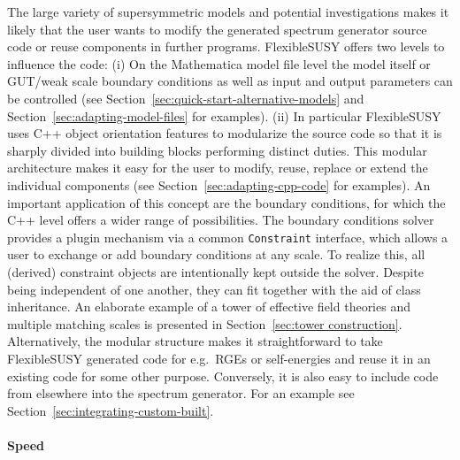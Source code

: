 \documentclass[final,3p,11pt,pdflatex]{elsarticle}
\makeatletter
\newcommand{\fs}{FlexibleSUSY\@\xspace}
\newcommand{\mathematica}{Mathematica\xspace}
\newcommand{\code}[1]{\lstinline|#1|}  %
\newcommand{\secref}[1]{Section~\ref{#1}}
\makeatother
\begin{document}
The large variety of supersymmetric models and potential
investigations makes it likely that the user wants to modify the
generated spectrum generator source code or reuse components in
further programs.  \fs offers two levels to influence the code: (i) On
the \mathematica model file level the model itself or GUT/weak scale
boundary conditions as well as input and output parameters can be
controlled (see \secref{sec:quick-start-alternative-models} and
\secref{sec:adapting-model-files} for examples).  (ii) In particular
\fs uses C++ object orientation features to modularize the source code
so that it is sharply divided into building blocks performing
distinct duties.
This modular architecture makes it easy
for the user to modify, reuse, replace or
extend the individual components (see \secref{sec:adapting-cpp-code}
for examples).  An important application of this concept are the
boundary conditions, for which the C++ level offers a wider range of
possibilities.  The boundary conditions solver provides a plugin
mechanism via a common \code{Constraint} interface, which allows a
user to exchange or add boundary conditions at any scale.
To realize this, all (derived) constraint objects are intentionally
kept outside the solver.  Despite being independent of one another,
they can fit together with the aid of class inheritance.  An
elaborate example of a tower of effective field theories and multiple
matching scales is presented in \secref{sec:tower construction}.
Alternatively, the modular structure makes it straightforward to take
\fs generated code for e.g.\ RGEs or self-energies and reuse it in an
existing code for some other purpose.  Conversely, it is also easy to
include code from elsewhere into the spectrum generator.  For an
example see \secref{sec:integrating-custom-built}.

\paragraph{Speed}
\end{document}
